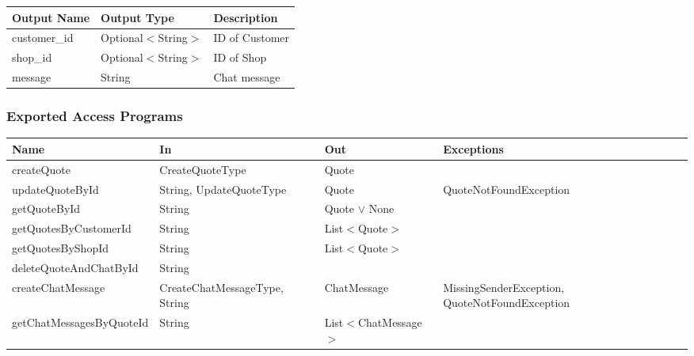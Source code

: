 \documentclass[12pt, titlepage]{article}
\begin{document}
\begin{table}[H]
	\begin{tabular}{|p{}|p{}|p{}|}
		\hline
		\textbf{Output Name} & \textbf{Output Type} & \textbf{Description} \\
		\hline
		customer\_id         & Optional$<$String$>$ & ID of Customer       \\
		\hline
		shop\_id             & Optional$<$String$>$ & ID of Shop           \\
		\hline
		message              & String               & Chat message         \\
		\hline
	\end{tabular}
\end{table}

\subsubsection{Exported Access Programs}

\begin{center}
	\begin{adjustbox}{width=\textwidth}
		\begin{tabular}{llll}
			\hline
			\textbf{Name}            & \textbf{In}                   & \textbf{Out}          & \textbf{Exceptions}                            \\
			\hline
			createQuote              & CreateQuoteType               & Quote                 & ~                                              \\
			updateQuoteById          & String, UpdateQuoteType       & Quote                 & QuoteNotFoundException                         \\
			getQuoteById             & String                        & Quote $\lor$ None     & ~                                              \\
			getQuotesByCustomerId    & String                        & List$<$Quote$>$       & ~                                              \\
			getQuotesByShopId        & String                        & List$<$Quote$>$       & ~                                              \\
			deleteQuoteAndChatById   & String                        & ~                     & ~                                              \\
			createChatMessage        & CreateChatMessageType, String & ChatMessage           & MissingSenderException, QuoteNotFoundException \\
			getChatMessagesByQuoteId & String                        & List$<$ChatMessage$>$ & ~                                              \\
			\hline
		\end{tabular}
	\end{adjustbox}
\end{center}
\end{document}
